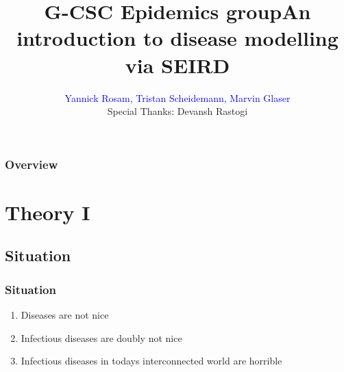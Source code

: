 \documentclass{beamer}
\title[Epidemics Wokrshop]{G-CSC Epidemics group\newline An introduction to disease modelling via SEIRD}
\author{\textcolor{blue}{Yannick Rosam, Tristan Scheidemann, Marvin Glaser\\}
\vspace{2mm}\footnotesize{Special Thanks: Devansh Rastogi}} %
\institute[G-CSC] %
{
Goethe Universtiy Frankfurt - Center for Scientific Computing \\ %
\medskip
}
\begin{document}


\begin{frame}
\titlepage %
\end{frame}


\begin{frame}
\frametitle{Overview} 
\tableofcontents 
\end{frame}




\section{Theory I}

\subsection{Situation}

\begin{frame}
	\frametitle{Situation}
	\begin{enumerate}
		\item Diseases are not nice\\\vspace{0.1cm}
	         			
		\item Infectious diseases are doubly not nice \\\vspace{0.1cm}
	       	
                \item Infectious diseases in todays interconnected world are horrible	\\\vspace{0.1cm}
	\end{enumerate}


\end{frame}
\end{document}
